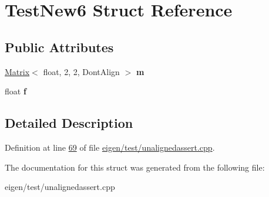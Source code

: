 \hypertarget{struct_test_new6}{}\section{Test\+New6 Struct Reference}
\label{struct_test_new6}
\subsection*{Public Attributes}
\begin{DoxyCompactItemize}
\item 
\mbox{\label{struct_test_new6_a9ff75f36dd15b13218403445d9a9c33d}} 
\hyperlink{group___core___module_class_eigen_1_1_matrix}{Matrix}$<$ float, 2, 2, Dont\+Align $>$ {\bfseries m}
\item 
\mbox{\label{struct_test_new6_aa23fded5f56e632f23cee58766a5a50e}} 
float {\bfseries f}
\end{DoxyCompactItemize}


\subsection{Detailed Description}


Definition at line \hyperlink{eigen_2test_2unalignedassert_8cpp_source_l00069}{69} of file \hyperlink{eigen_2test_2unalignedassert_8cpp_source}{eigen/test/unalignedassert.\+cpp}.



The documentation for this struct was generated from the following file\+:\begin{DoxyCompactItemize}
\item 
eigen/test/unalignedassert.\+cpp\end{DoxyCompactItemize}
